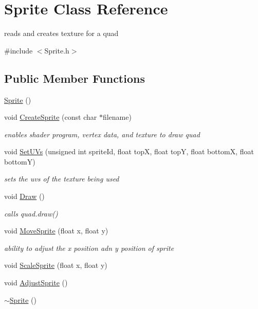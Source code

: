 \hypertarget{class_sprite}{}\section{Sprite Class Reference}
\label{class_sprite}


reads and creates texture for a quad  




{\ttfamily \#include $<$Sprite.\+h$>$}

\subsection*{Public Member Functions}
\begin{DoxyCompactItemize}
\item 
\hyperlink{class_sprite_a12cba3ac1868418add3c4d95ce87e615}{Sprite} ()
\item 
void \hyperlink{class_sprite_ad9cb3e4978cec898aedcc0126642e2d2}{Create\+Sprite} (const char $\ast$filename)
\begin{DoxyCompactList}\small\item\em enables shader program, vertex data, and texture to draw quad \end{DoxyCompactList}\item 
void \hyperlink{class_sprite_a550265943afb5e79fd76f1c163fb9415}{Set\+U\+Vs} (unsigned int sprite\+Id, float top\+X, float top\+Y, float bottom\+X, float bottom\+Y)
\begin{DoxyCompactList}\small\item\em sets the uvs of the texture being used \end{DoxyCompactList}\item 
void \hyperlink{class_sprite_a054a4c340c14c3d218b99e484bf83d21}{Draw} ()
\begin{DoxyCompactList}\small\item\em calls quad.\+draw() \end{DoxyCompactList}\item 
void \hyperlink{class_sprite_aa803a9eae66b98130f2ef589db24692a}{Move\+Sprite} (float x, float y)
\begin{DoxyCompactList}\small\item\em ability to adjust the x position adn y position of sprite \end{DoxyCompactList}\item 
void \hyperlink{class_sprite_acf9da4f7a3caf15004f69c9bcc696b5c}{Scale\+Sprite} (float x, float y)
\item 
void \hyperlink{class_sprite_a7f4858ef8ab1aa9caf60522b6c89cf9c}{Adjust\+Sprite} ()
\item 
\hyperlink{class_sprite_a8accab430f9d90ae5117b57d67e32b84}{$\sim$\+Sprite} ()
\end{DoxyCompactItemize}
